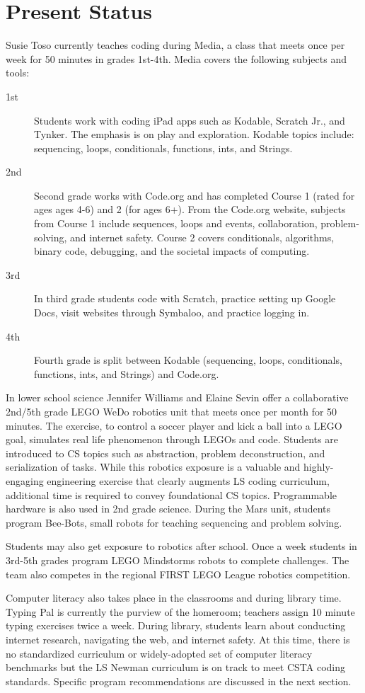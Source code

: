 \section{Present Status}
Susie Toso currently teaches coding during Media, a class that meets once per week for 50 minutes in grades 1st-4th. Media covers the following subjects and tools:
\begin{description}
	\item [1st] Students work with coding iPad apps such as Kodable, Scratch Jr., and Tynker. The emphasis is on play and exploration. Kodable topics include: sequencing, loops, conditionals, functions, ints, and Strings.
	\item [2nd] Second grade works with Code.org and has completed Course 1 (rated for ages ages 4-6) and 2 (for ages 6+). From the Code.org website, subjects from Course 1 include sequences, loops and events, collaboration, problem-solving, and internet safety. Course 2 covers conditionals, algorithms, binary code, debugging, and the societal impacts of computing.
	\item [3rd] In third grade students code with Scratch, practice setting up Google Docs, visit websites through Symbaloo, and practice logging in.
	\item [4th] Fourth grade is split between Kodable (sequencing, loops, conditionals, functions, ints, and Strings) and Code.org. 
\end{description}
In lower school science Jennifer Williams and Elaine Sevin offer a collaborative 2nd/5th grade LEGO WeDo robotics unit that meets once per month for 50 minutes. The exercise, to control a soccer player and kick a ball into a LEGO goal, simulates real life phenomenon through LEGOs and code. Students are introduced to CS topics such as abstraction, problem deconstruction, and serialization of tasks. While this robotics exposure is a valuable and highly-engaging engineering exercise that clearly augments LS coding curriculum, additional time is required to convey foundational CS topics. Programmable hardware is also used in 2nd grade science. During the Mars unit, students program Bee-Bots, small robots for teaching sequencing and problem solving. \par
Students may also get exposure to robotics after school. Once a week students in 3rd-5th grades program LEGO Mindstorms robots to complete challenges. The team also competes in the regional FIRST LEGO League robotics competition.\par  
Computer literacy also takes place in the classrooms and during library time. Typing Pal is currently the purview of the homeroom; teachers assign 10 minute typing exercises twice a week. During library, students learn about conducting internet research, navigating the web, and internet safety. At this time, there is no standardized curriculum or widely-adopted set of computer literacy benchmarks but the LS Newman curriculum is on track to meet CSTA coding standards. Specific program recommendations are discussed in the next section.\par

